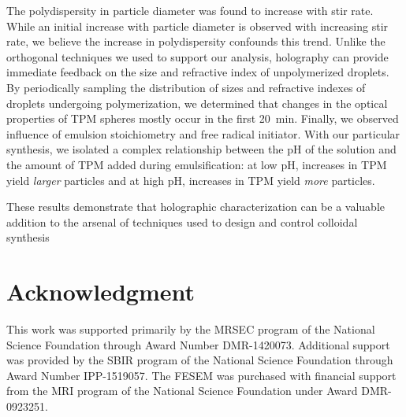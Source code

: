 The polydispersity in particle diameter was found to increase
with stir rate. While an initial increase with particle diameter is observed with increasing
stir rate, we believe the increase in polydispersity confounds this trend.
Unlike the orthogonal techniques we used to support our analysis,
holography can provide immediate feedback on the size and refractive index of unpolymerized
droplets. By periodically sampling the distribution of sizes and refractive indexes of
droplets undergoing polymerization, we determined that changes in the optical properties
of TPM spheres mostly occur in the first \SI{20}{\minute}. Finally, we observed
influence of emulsion stoichiometry and free radical initiator.
With our particular synthesis, we isolated a complex
relationship between the pH of the solution and the amount of TPM added
during emulsification: at low pH, increases in TPM yield \emph{larger}
particles and at high pH, increases in TPM yield \emph{more} particles.


These results demonstrate that holographic characterization can be a valuable
addition to the arsenal of techniques used to design and control colloidal
synthesis

\section{Acknowledgment}

This work was supported primarily by the MRSEC program of
the National Science Foundation through Award Number DMR-1420073.
Additional support was provided by the SBIR program of the
National Science Foundation through Award Number IPP-1519057.
The FESEM was purchased with financial support from the MRI program
of the National Science Foundation under Award DMR-0923251.
